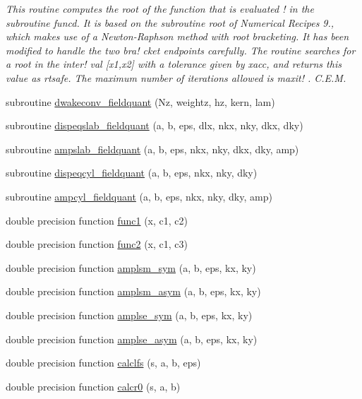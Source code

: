 \begin{DoxyCompactItemize}
\begin{DoxyCompactList}\small\item\em This routine computes the root of the function that is evaluated ! in the subroutine \textquotesingle{}funcd\textquotesingle{}. It is based on the subroutine \textquotesingle{}root\textquotesingle{} of Numerical Recipes 9., which makes use of a Newton-\/\+Raphson method with root bracketing. It has been modified to handle the two bra! cket endpoints carefully. The routine searches for a root in the inter! val \mbox{[}x1,x2\mbox{]} with a tolerance given by \textquotesingle{}xacc\textquotesingle{}, and returns this value as \textquotesingle{}rtsafe\textquotesingle{}. The maximum number of iterations allowed is \textquotesingle{}maxit\textquotesingle{}! . C.\+E.\+M. \end{DoxyCompactList}\item 
subroutine \mbox{\hyperlink{namespacefieldquantclass_a80dd0228de4fecabda6f6696b098a11f}{dwakeconv\+\_\+fieldquant}} (Nz, weightz, hz, kern, lam)
\item 
subroutine \mbox{\hyperlink{namespacefieldquantclass_a362a63ffd1dbce47680a0224d88552c7}{dispeqslab\+\_\+fieldquant}} (a, b, eps, dlx, nkx, nky, dkx, dky)
\item 
subroutine \mbox{\hyperlink{namespacefieldquantclass_ac5166a3094bb6567db04903c1f43e4b6}{ampslab\+\_\+fieldquant}} (a, b, eps, nkx, nky, dkx, dky, amp)
\item 
subroutine \mbox{\hyperlink{namespacefieldquantclass_ac9b2b94f5051c235120e16bd55e0148d}{dispeqcyl\+\_\+fieldquant}} (a, b, eps, nkx, nky, dky)
\item 
subroutine \mbox{\hyperlink{namespacefieldquantclass_a0cf12c2453dd024814caca1b9dbbb9a5}{ampcyl\+\_\+fieldquant}} (a, b, eps, nkx, nky, dky, amp)
\item 
double precision function \mbox{\hyperlink{namespacefieldquantclass_a3979aaa9ea17b446b00cd5477dfd354e}{func1}} (x, c1, c2)
\item 
double precision function \mbox{\hyperlink{namespacefieldquantclass_a1758703e79afc95b20c7fd7261fa4afe}{func2}} (x, c1, c3)
\item 
double precision function \mbox{\hyperlink{namespacefieldquantclass_aaf0193e68163e6fb2bba0a9477f19cb0}{amplsm\+\_\+sym}} (a, b, eps, kx, ky)
\item 
double precision function \mbox{\hyperlink{namespacefieldquantclass_ac67e15255b5d57fb3c3a29ef79addb63}{amplsm\+\_\+asym}} (a, b, eps, kx, ky)
\item 
double precision function \mbox{\hyperlink{namespacefieldquantclass_a8eb7b870ec7c240279076fbb6269ff07}{amplse\+\_\+sym}} (a, b, eps, kx, ky)
\item 
double precision function \mbox{\hyperlink{namespacefieldquantclass_a735a6d51aabd219f525edeb04b034150}{amplse\+\_\+asym}} (a, b, eps, kx, ky)
\item 
double precision function \mbox{\hyperlink{namespacefieldquantclass_a491cfca134ed1bb2dfc47d6de7fdd972}{calclfs}} (s, a, b, eps)
\item 
double precision function \mbox{\hyperlink{namespacefieldquantclass_a765f0fc87c405fa965c6c966794db11c}{calcr0}} (s, a, b)
\end{DoxyCompactItemize}


